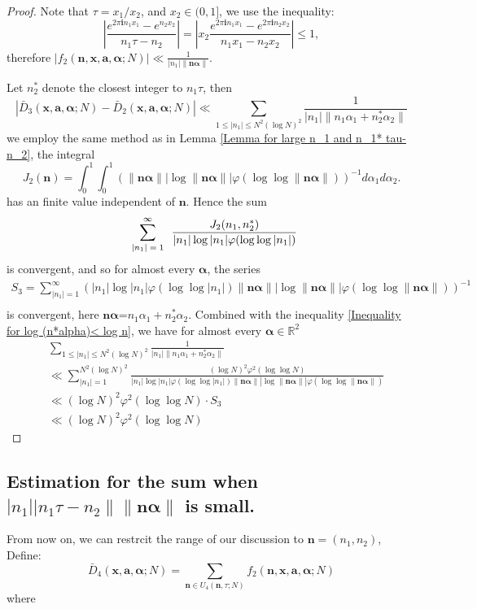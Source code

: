 \documentclass[11pt]{article}
\newcommand{\beq}{\begin{equation}}
\newcommand{\eeq}{\end{equation}}
\newcommand{\fc}{\frac}
\renewcommand{\l}{\left}
\renewcommand{\r}{\right}
\newcommand{\Z}{\mathbb{Z}}
\newcommand{\R}{\mathbb{R}}
\renewcommand{\a}{\alpha}
\renewcommand{\b}{\beta}
\renewcommand{\i}{\mathbf{i}}
\renewcommand{\(}{\left(}
\renewcommand{\)}{\right)}
\renewcommand{\bf}{\mathbf}
\newcommand{\ba}{\begin{array}}
\newcommand{\ea}{\end{array}}
\newcommand{\bal}{\begin{aligned}}
\newcommand{\eal}{\end{aligned}}
\newcommand{\n}{\bf{n}}
\newcommand{\bma}{\bm{\alpha}}
\newcommand{\ftwo}{f_2(\bf{n},\bf{x},\bm{a},\bm{\a};N)}
\newcommand{\<}{\langle}
\renewcommand{\>}{\rangle}
\begin{document}
\begin{proof}
Note that $\tau=x_1/x_2$, and $x_2\in (0,1]$, we use the inequality:
$$\l|\fc{e^{2\pi\i n_1x_1}-e^{n_2x_2}}{n_1\tau-n_2}\r|= \l|x_2\fc{e^{2\pi\i n_1x_1}-e^{2\pi \i n_2x_2}}{n_1x_1-n_2x_2} \r|\le1,$$
therefore $\l|\ftwo\r|\ll \fc{1}{|n_1|\|\n\bma\|}$.

Let $n^*_2$ denote the closest integer to $n_1\tau$, then
$$
|\bar{D}_3(\bf{x},\bm{a},\bm{\a};N)-\bar{D}_2(\bf{x},\bm{a},\bm{\a};N)|\ll \sum_{1\le |n_1|\le N^2(\log N)^2} \fc{1}{|n_1| \|n_1\a_1 + n_2^* \a_2\|}
$$ 
we employ the same method as in Lemma \ref{Lemma for large n_1 and n_1* tau-n_2}, the integral
$$
J_2(\n)=\int_0^1\int_0^1 \l(\|\n\bma\|\l|\log \|\n\bma\|\r| \varphi(\log \log \| \n\bma\|)\r)^{-1} d\a_1d\a_2 .
$$
has an finite value independent of $\n$. 
Hence the sum 
$$
\sum_{\mbox{\scriptsize $\ba{c}  |n_1|=1 \ea$}}^{\infty} \fc{J_2(n_1, n^*_2)}{|n_1|\log |n_1| \varphi(\log \log|n_1|)}
$$
is convergent, and so for almost every $\bma$, the series 
$$
\bal
S_3=\sum_{|n_1|=1}^{\infty} \l(|n_1|\log |n_1| \varphi(\log \log|n_1|)\|\n\bma\|\l|\log \|\n\bma\|\r| \varphi(\log \log \| \n\bma\|) \r)^{-1}\\
\eal
$$
is convergent, here $\n\bma$=$n_1\a_1+n^*_2\a_2$.
Combined with the inequality \eqref{Inequality for log (n*alpha)< log n}, we have for almost every $\bma\in \R^2$
$$
\bal
&\sum_{1\le |n_1|\le N^2(\log N)^2} \fc{1}{|n_1| \|n_1\a_1 + n_2^* \a_2\|}\\
&\ll \sum_{|n_1|=1}^{N^2(\log N)^2} \fc{(\log N)^2\varphi^2(\log \log N)}{|n_1|\log |n_1| \varphi(\log \log|n_1|)\|\n\bma\|\l|\log \|\n\bma\|\r| \varphi(\log \log \| \n\bma\|)}\\
&\ll(\log N)^2\varphi^2(\log \log N) \cdot S_3\\ 
&\ll (\log N)^2\varphi^2(\log \log N) 
\eal
$$
\end{proof}

\subsection{Estimation for the sum when $|n_1||n_1 \tau-n_2 \|\|\n \bma\|$ is small.}
From now on, we can restrcit the range of our discussion to $\bf{n}=(n_1,n_2)$, Define:
\beq\label{sum of small divisors}
\bar{D}_4(\bf{x},\bm{a},\bm{\a};N)=\sum_{\n\in U_4(\n,\tau;N)}  \ftwo
\eeq
where %
\end{document}
